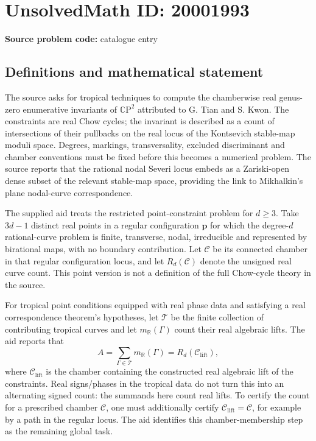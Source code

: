 \documentclass[11pt]{article}
\newcommand{\R}{\mathbb{R}}
\newcommand{\C}{\mathbb{C}}
\begin{document}
\section*{UnsolvedMath ID: 20001993}
\textbf{Source problem code:} catalogue entry
\subsection{Definitions and mathematical statement}
The source asks for tropical techniques to compute the chamberwise real genus-zero enumerative invariants of \(\C\mathrm P^2\) attributed to G. Tian and S. Kwon. The constraints are real Chow cycles; the invariant is described as a count of intersections of their pullbacks on the real locus of the Kontsevich stable-map moduli space. Degrees, markings, transversality, excluded discriminant and chamber conventions must be fixed before this becomes a numerical problem. The source reports that the rational nodal Severi locus embeds as a Zariski-open dense subset of the relevant stable-map space, providing the link to Mikhalkin's plane nodal-curve correspondence.

The supplied aid treats the restricted point-constraint problem for \(d\geq3\). Take \(3d-1\) distinct real points in a regular configuration \(\mathbf p\) for which the degree-\(d\) rational-curve problem is finite, transverse, nodal, irreducible and represented by birational maps, with no boundary contribution. Let \(\mathcal C\) be its connected chamber in that regular configuration locus, and let \(R_d(\mathcal C)\) denote the unsigned real curve count. This point version is not a definition of the full Chow-cycle theory in the source.

For tropical point conditions equipped with real phase data and satisfying a real correspondence theorem's hypotheses, let \(\mathcal T\) be the finite collection of contributing tropical curves and let \(m_{\R}(\Gamma)\) count their real algebraic lifts. The aid reports that
\[
A=\sum_{\Gamma\in\mathcal T}m_{\R}(\Gamma)
=R_d(\mathcal C_{\mathrm{lift}}),
\]
where \(\mathcal C_{\mathrm{lift}}\) is the chamber containing the constructed real algebraic lift of the constraints. Real signs/phases in the tropical data do not turn this into an alternating signed count: the summands here count real lifts. To certify the count for a prescribed chamber \(\mathcal C\), one must additionally certify \(\mathcal C_{\mathrm{lift}}=\mathcal C\), for example by a path in the regular locus. The aid identifies this chamber-membership step as the remaining global task.
\end{document}
